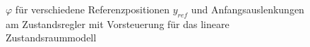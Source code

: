 \begin{figure}[H]
    \centering
    \caption[$\varphi$ für Regler mit Vorsteuerung (linear)]{$\varphi$ für verschiedene Referenzpositionen $y_{ref}$ und Anfangsauslenkungen am Zustandsregler mit Vorsteuerung für das lineare Zustandsraummodell}
    \label{fig:Bild18}
\end{figure}

